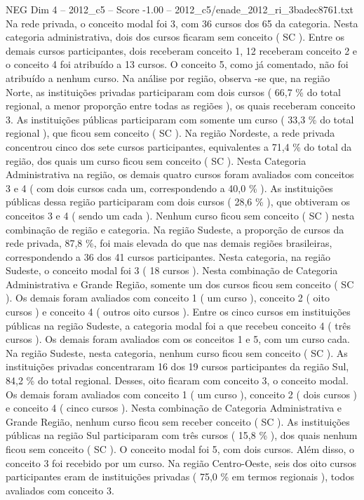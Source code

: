 \begin{textsample}{NEG Dim 4 – 2012\_c5 – Score -1.00 – 2012\_c5/enade\_2012\_ri\_3badec8761.txt}
Na rede privada, o conceito modal foi 3, com 36 cursos dos 65 da categoria.
Nesta categoria administrativa, dois dos cursos ficaram sem conceito ( SC ).
Entre os demais cursos participantes, dois receberam conceito 1, 12 receberam conceito 2 e o conceito 4 foi atribuído a 13 cursos.
O conceito 5, como já comentado, não foi atribuído a nenhum curso.
Na análise por região, observa -se que, na região Norte, as instituições privadas participaram com dois cursos ( 66,7 \% do total regional, a menor proporção entre todas as regiões ), os quais receberam conceito 3.
As instituições públicas participaram com somente um curso ( 33,3 \% do total regional ), que ficou sem conceito ( SC ).
Na região Nordeste, a rede privada concentrou cinco dos sete cursos participantes, equivalentes a 71,4 \% do total da região, dos quais um curso ficou sem conceito ( SC ).
Nesta Categoria Administrativa na região, os demais quatro cursos foram avaliados com conceitos 3 e 4 ( com dois cursos cada um, correspondendo a 40,0 \% ).
As instituições públicas dessa região participaram com dois cursos ( 28,6 \% ), que obtiveram os conceitos 3 e 4 ( sendo um cada ).
Nenhum curso ficou sem conceito ( SC ) nesta combinação de região e categoria.
Na região Sudeste, a proporção de cursos da rede privada, 87,8 \%, foi mais elevada do que nas demais regiões brasileiras, correspondendo a 36 dos 41 cursos participantes.
Nesta categoria, na região Sudeste, o conceito modal foi 3 ( 18 cursos ).
Nesta combinação de Categoria Administrativa e Grande Região, somente um dos cursos ficou sem conceito ( SC ).
Os demais foram avaliados com conceito 1 ( um curso ), conceito 2 ( oito cursos ) e conceito 4 ( outros oito cursos ).
Entre os cinco cursos em instituições públicas na região Sudeste, a categoria modal foi a que recebeu conceito 4 ( três cursos ).
Os demais foram avaliados com os conceitos 1 e 5, com um curso cada.
Na região Sudeste, nesta categoria, nenhum curso ficou sem conceito ( SC ).
As instituições privadas concentraram 16 dos 19 cursos participantes da região Sul, 84,2 \% do total regional.
Desses, oito ficaram com conceito 3, o conceito modal.
Os demais foram avaliados com conceito 1 ( um curso ), conceito 2 ( dois cursos ) e conceito 4 ( cinco cursos ).
Nesta combinação de Categoria Administrativa e Grande Região, nenhum curso ficou sem receber conceito ( SC ).
As instituições públicas na região Sul participaram com três cursos ( 15,8 \% ), dos quais nenhum ficou sem conceito ( SC ).
O conceito modal foi 5, com dois cursos.
Além disso, o conceito 3 foi recebido por um curso.
Na região Centro-Oeste, seis dos oito cursos participantes eram de instituições privadas ( 75,0 \% em termos regionais ), todos avaliados com conceito 3.

\end{textsample}
